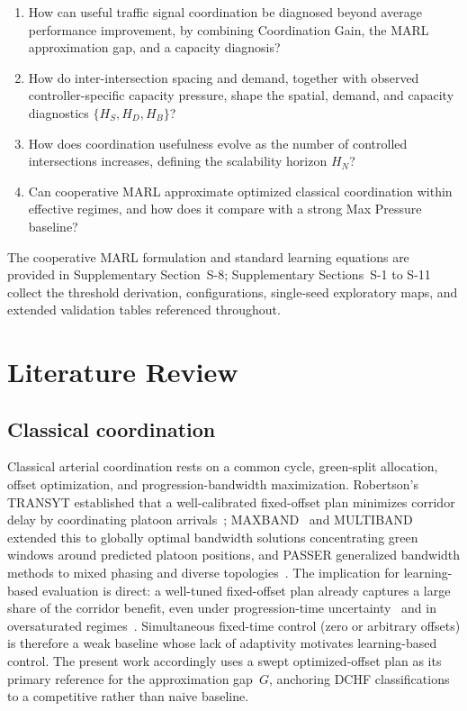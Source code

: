 \documentclass[review,12pt]{elsarticle}
\begin{document}
\begin{enumerate}[label=\textbf{RQ\arabic*.}, leftmargin=1.5cm]
\item How can useful traffic signal coordination be diagnosed beyond 
average performance improvement, by combining Coordination Gain, the 
MARL approximation gap, and a capacity diagnosis?
\item How do inter-intersection spacing and demand, together with observed
controller-specific capacity pressure, shape the spatial, demand, and
capacity diagnostics $\{H_S,H_D,H_B\}$?
\item How does coordination usefulness evolve as the number of controlled 
intersections increases, defining the scalability horizon $H_N$?
\item Can cooperative MARL approximate optimized classical coordination 
within effective regimes, and how does it compare with a strong Max 
Pressure baseline?
\end{enumerate}

The cooperative MARL formulation and standard learning equations are provided in Supplementary Section~S-8; Supplementary Sections~S-1 to S-11 collect the threshold derivation, configurations, single-seed exploratory maps, and extended validation tables referenced throughout.


\section{Literature Review}
\label{sec:literature}

\subsection{Classical coordination}
\label{subsec:lit_classical}

Classical arterial coordination rests on a common cycle, green-split allocation, offset optimization, and progression-bandwidth maximization. Robertson's TRANSYT established that a well-calibrated fixed-offset plan minimizes corridor delay by coordinating platoon arrivals~\cite{robertson1969transyt}; MAXBAND~\cite{jingquanli2014,little1981maxband} and MULTIBAND~\cite{gartner1990multiband} extended this to globally optimal bandwidth solutions concentrating green windows around predicted platoon positions, and PASSER generalized bandwidth methods to mixed phasing and diverse topologies~\cite{binbinjing2023}. The implication for learning-based evaluation is direct: a well-tuned fixed-offset plan already captures a large share of the corridor benefit, even under progression-time uncertainty~\cite{sangkeykim2015} and in oversaturated regimes~\cite{monttygirianna2004,xiaolongma2020}. Simultaneous fixed-time control (zero or arbitrary offsets) is therefore a weak baseline whose lack of adaptivity motivates learning-based control. The present work accordingly uses a swept optimized-offset plan as its primary reference for the approximation gap~$G$, anchoring DCHF classifications to a competitive rather than naive baseline.
\end{document}
